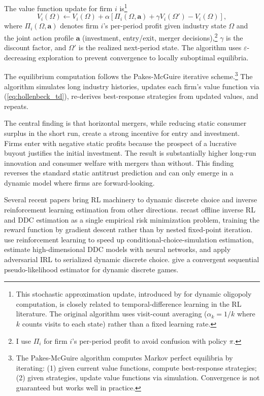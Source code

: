 The value function update for firm $i$ is\footnote{This stochastic approximation update, introduced by \citet{PakesMcGuire1994} for dynamic oligopoly computation, is closely related to temporal-difference learning in the RL literature. The original algorithm uses visit-count averaging ($\alpha_k = 1/k$ where $k$ counts visits to each state) rather than a fixed learning rate.}
\begin{equation}
V_i(\Omega) \leftarrow V_i(\Omega) + \alpha\left[\Pi_i(\Omega, \mathbf{a}) + \gamma V_i(\Omega') - V_i(\Omega)\right], \label{eq:hollenbeck_td}
\end{equation}
where $\Pi_i(\Omega, \mathbf{a})$ denotes firm $i$'s per-period profit given industry state $\Omega$ and the joint action profile $\mathbf{a}$ (investment, entry/exit, merger decisions),\footnote{I use $\Pi_i$ for firm $i$'s per-period profit to avoid confusion with policy $\pi$.} $\gamma$ is the discount factor, and $\Omega'$ is the realized next-period state. The algorithm uses $\varepsilon$-decreasing exploration to prevent convergence to locally suboptimal equilibria.

The equilibrium computation follows the Pakes-McGuire iterative scheme.\footnote{The Pakes-McGuire algorithm \citep{PakesMcGuire1994} computes Markov perfect equilibria by iterating: (1) given current value functions, compute best-response strategies; (2) given strategies, update value functions via simulation. Convergence is not guaranteed but works well in practice.} The algorithm simulates long industry histories, updates each firm's value function via (\ref{eq:hollenbeck_td}), re-derives best-response strategies from updated values, and repeats.

The central finding is that horizontal mergers, while reducing static consumer surplus in the short run, create a strong incentive for entry and investment. Firms enter with negative static profits because the prospect of a lucrative buyout justifies the initial investment. The result is substantially higher long-run innovation and consumer welfare with mergers than without. This finding reverses the standard static antitrust prediction and can only emerge in a dynamic model where firms are forward-looking.

Several recent papers bring RL machinery to dynamic discrete choice and inverse reinforcement learning estimation from other directions. \citet{Kang2025} recast offline inverse RL and DDC estimation as a single empirical risk minimization problem, training the reward function by gradient descent rather than by nested fixed-point iteration. \citet{Khwaja2025} use reinforcement learning to speed up conditional-choice-simulation estimation, \citet{Nguyen2025} estimate high-dimensional DDC models with neural networks, and \citet{Lee2026} apply adversarial IRL to serialized dynamic discrete choice. \citet{DearingBlevins2025} give a convergent sequential pseudo-likelihood estimator for dynamic discrete games.

